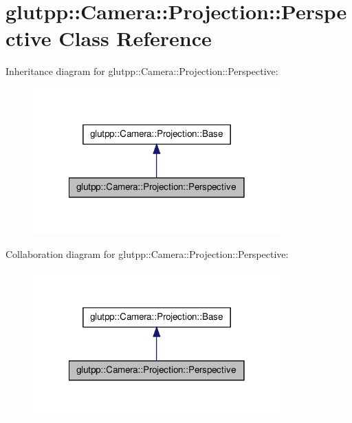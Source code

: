 \hypertarget{classglutpp_1_1Camera_1_1Projection_1_1Perspective}{\section{glutpp\-:\-:\-Camera\-:\-:\-Projection\-:\-:\-Perspective \-Class \-Reference}
\label{classglutpp_1_1Camera_1_1Projection_1_1Perspective}
}


\-Inheritance diagram for glutpp\-:\-:\-Camera\-:\-:\-Projection\-:\-:\-Perspective\-:\nopagebreak
\begin{figure}[H]
\begin{center}
\leavevmode
\includegraphics[width=270pt]{classglutpp_1_1Camera_1_1Projection_1_1Perspective__inherit__graph}
\end{center}
\end{figure}


\-Collaboration diagram for glutpp\-:\-:\-Camera\-:\-:\-Projection\-:\-:\-Perspective\-:\nopagebreak
\begin{figure}[H]
\begin{center}
\leavevmode
\includegraphics[width=270pt]{classglutpp_1_1Camera_1_1Projection_1_1Perspective__coll__graph}
\end{center}
\end{figure}
